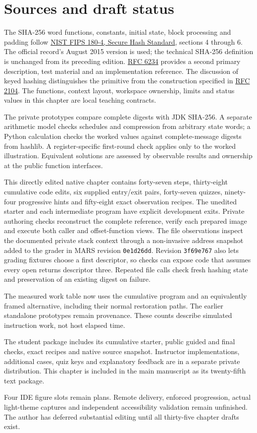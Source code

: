 \section*{Sources and draft status}
The SHA-256 word functions, constants, initial state, block processing and padding follow
\href{https://doi.org/10.6028/NIST.FIPS.180-4}{NIST FIPS 180-4, Secure Hash Standard},
sections 4 through 6. The official record's August 2015 version is used; the technical
SHA-256 definition is unchanged from its preceding edition.
\href{https://www.rfc-editor.org/rfc/rfc6234}{RFC 6234} provides a second primary
description, test material and an implementation reference. The discussion of keyed
hashing distinguishes the primitive from the construction specified in
\href{https://www.rfc-editor.org/rfc/rfc2104}{RFC 2104}. The functions, context layout,
workspace ownership, limits and status values in this chapter are local teaching contracts.

The private prototypes compare complete digests with JDK SHA-256. A separate arithmetic
model checks schedules and compression from arbitrary state words; a Python calculation
checks the worked values against complete-message digests from hashlib. A register-specific
first-round check applies only to the worked illustration. Equivalent solutions are
assessed by observable results and ownership at the public function interfaces.

This directly edited native chapter contains forty-seven steps, thirty-eight cumulative
code edits, six supplied entry/exit pairs, forty-seven quizzes, ninety-four progressive
hints and fifty-eight exact observation recipes. The unedited starter and each intermediate
program have explicit development exits. Private authoring checks reconstruct the complete
reference, verify each prepared image and execute both caller and offset-function views.
The file observations inspect the documented private stack context through a non-invasive
address snapshot added to the grader in MARS revision \texttt{0e1d26dd}.
Revision \texttt{3f69e767} also lets grading fixtures choose a first descriptor, so
checks can expose code that assumes every open returns descriptor three. Repeated
file calls check fresh hashing state and preservation of an existing digest on failure.

The measured work table now uses the cumulative program and an equivalently framed
alternative, including their normal restoration paths. The earlier standalone prototypes
remain provenance. These counts describe simulated instruction work, not host elapsed time.

The student package includes its cumulative starter, public guided and final checks,
exact recipes and native source snapshot. Instructor implementations, additional cases,
quiz keys and explanatory feedback are in a separate private distribution. This chapter
is included in the main manuscript as its twenty-fifth text package.

Four IDE figure slots remain plans. Remote delivery, enforced progression, actual
light-theme captures and independent accessibility validation remain unfinished. The
author has deferred substantial editing until all thirty-five chapter drafts exist.
